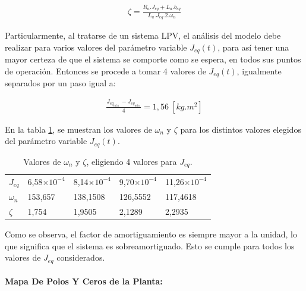 \documentclass{article}
\begin{document}
\begin{sloppypar}
\begin{align} \label{eq:Factor de Amortiguamiento}
    \zeta=\frac{R_a.J_{eq}+L_a.b_{eq}}{L_a.J_{eq}\text{.2}.\omega_n}
\end{align}

Particularmente, al tratarse de un sistema LPV, el análisis del modelo debe realizar para varios valores del parámetro variable $J_{eq}(t)$, para así tener una mayor certeza de que el sistema se comporte como se espera, en todos sus puntos de operación. Entonces se procede a tomar 4 valores de $J_{eq}(t)$, igualmente separados por un paso igual a:

\begin{align} \label{eq:Paso para la selección de los valores del parámetro variable J_eq(t)}
    \frac{J_{eq_{\text{máx.}}}-J_{eq_{\text{mín.}}}}{4}=1,56 ~[kg.m^2]
\end{align}

En la tabla \ref{table:Valores de omega_n y zeta, eligiendo 4 valores para J_eq}, se muestran los valores de $\omega_n$ y $\zeta$ para los distintos valores elegidos del parámetro variable $J_{eq}(t)$.

\begin{table}[H]
    \centering
    \begin{tabular}{|l|llll|}
    \cline{1-5}
    \textbf{$J_{eq}$}   & 6,58$\times10^{-4}$ & 8,14$\times10^{-4}$  & 9,70$\times10^{-4}$  & 11,26$\times10^{-4}$ \\ \cline{1-5}
    \textbf{$\omega_n$} & 153,657             & 138,1508             & 126,5552             & 117,4618             \\ \cline{1-5}
    \textbf{$\zeta$}    & 1,754               & 1,9505               & 2,1289               & 2,2935               \\ \cline{1-5}
    \end{tabular}
    \caption{\label{table:Valores de omega_n y zeta, eligiendo 4 valores para J_eq}Valores de $\omega_n$ y $\zeta$, eligiendo 4 valores para $J_{eq}$.}
\end{table}

Como se observa, el factor de amortiguamiento es siempre mayor a la unidad, lo que significa que el sistema es sobreamortiguado. Esto se cumple para todos los valores de $J_{eq}$ considerados.


\paragraph{Mapa De Polos Y Ceros de la Planta:}
\label{sec:Mapa De Polos Y Ceros de la Planta:}
\hfill


\end{sloppypar}
\end{document}
